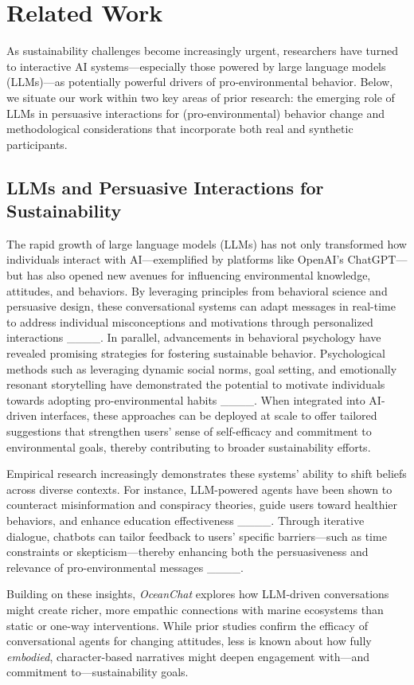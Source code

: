 \section{Related Work}
As sustainability challenges become increasingly urgent, researchers have turned to interactive AI systems—especially those powered by large language models (LLMs)—as potentially powerful drivers of pro-environmental behavior. Below, we situate our work within two key areas of prior research: the emerging role of LLMs in persuasive interactions for (pro-environmental) behavior change and methodological considerations that incorporate both real and synthetic participants.

\subsection{LLMs and Persuasive Interactions for Sustainability}
The rapid growth of large language models (LLMs) has not only transformed how individuals interact with AI—exemplified by platforms like OpenAI’s ChatGPT—but has also opened new avenues for influencing environmental knowledge, attitudes, and behaviors. By leveraging principles from behavioral science and persuasive design, these conversational systems can adapt messages in real-time to address individual misconceptions and motivations through personalized interactions ____. In parallel, advancements in behavioral psychology have revealed promising strategies for fostering sustainable behavior. Psychological methods such as leveraging dynamic social norms, goal setting, and emotionally resonant storytelling have demonstrated the potential to motivate individuals towards adopting pro-environmental habits ____. When integrated into AI-driven interfaces, these approaches can be deployed at scale to offer tailored suggestions that strengthen users’ sense of self-efficacy and commitment to environmental goals, thereby contributing to broader sustainability efforts.

Empirical research increasingly demonstrates these systems’ ability to shift beliefs across diverse contexts. For instance, LLM-powered agents have been shown to counteract misinformation and conspiracy theories, guide users toward healthier behaviors, and enhance education effectiveness ____. Through iterative dialogue, chatbots can tailor feedback to users’ specific barriers—such as time constraints or skepticism—thereby enhancing both the persuasiveness and relevance of pro-environmental messages ____. 

Building on these insights, \textit{OceanChat} explores how LLM-driven conversations might create richer, more empathic connections with marine ecosystems than static or one-way interventions. While prior studies confirm the efficacy of conversational agents for changing attitudes, less is known about how fully \textit{embodied}, character-based narratives might deepen engagement with—and commitment to—sustainability goals.

